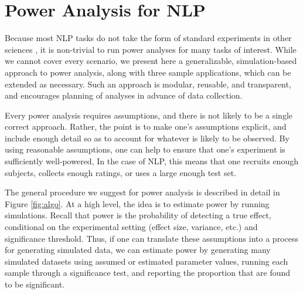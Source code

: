 \documentclass[11pt,a4paper]{article}
\begin{document}
\section{Power Analysis for NLP}
\label{sec:nlp_power}

Because most NLP tasks do not take the form of standard experiments in other sciences \citep{kraemer.2015,westfall.2014}, it is non-trivial to run power analyses for many tasks of interest.
While we cannot cover every scenario, we present here a generalizable, simulation-based approach to power analysis, along with three sample applications, which can be extended as necessary.
Such an approach is modular, reusable, and transparent, and encourages planning of analyses in advance of data collection.

Every power analysis requires assumptions, and there is not likely to be a single correct approach. Rather, the point is to make one's assumptions explicit, and include enough detail so as to account for whatever is likely to be observed. By using reasonable assumptions, one can help to ensure that one's experiment is sufficiently well-powered, In the case of NLP, this means that one recruits enough subjects, collects enough ratings, or uses a large enough test set.

The general procedure we suggest for power analysis is described in detail in Figure \ref{fig:algo}. At a high level, the idea is to estimate power by running simulations. Recall that power is the probability of detecting a true effect, conditional on the experimental setting (effect size, variance, etc.) and significance threshold. Thus, if one can translate these assumptions into a process for generating simulated data, we can estimate power by generating many simulated datasets using assumed or estimated parameter values, running each sample through a significance test, and reporting the proportion that are found to be significant.
\end{document}
